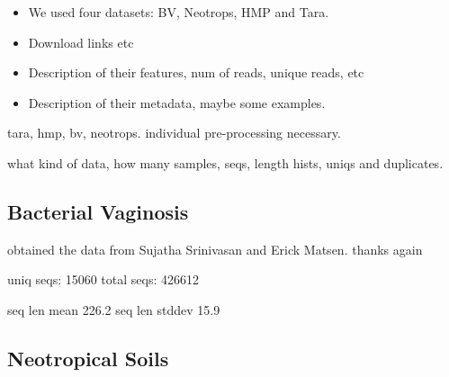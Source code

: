 \begin{itemize}
    \item We used four datasets: BV, Neotrops, HMP and Tara.
    \item Download links etc
    \item Description of their features, num of reads, unique reads, etc
    \item Description of their metadata, maybe some examples.
\end{itemize}




%
%
%



tara, hmp, bv, neotrops. individual pre-processing necessary.

what kind of data, how many samples, seqs, length hists, uniqs and duplicates.


\subsection{Bacterial Vaginosis}
\label{sec:MetagenomicDatasets:sub:BacterialVaginosis}

obtained the data from Sujatha Srinivasan and Erick Matsen. thanks again

uniq seqs: 15060
total seqs: 426612

seq len mean 226.2
seq len stddev 15.9


\subsection{Neotropical Soils}
\label{sec:MetagenomicDatasets:sub:NeotropicalSoils}


